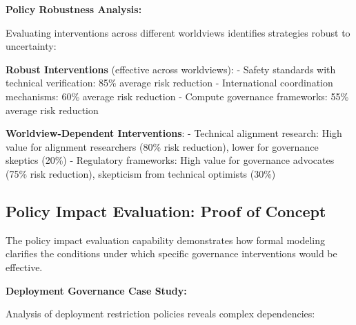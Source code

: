 \documentclass[
  11pt,
  letterpaper,
]{book}
\begin{document}
\textbf{Policy Robustness Analysis:}

Evaluating interventions across different worldviews identifies
strategies robust to uncertainty:

\textbf{Robust Interventions} (effective across worldviews): - Safety
standards with technical verification: 85\% average risk reduction -
International coordination mechanisms: 60\% average risk reduction -
Compute governance frameworks: 55\% average risk reduction

\textbf{Worldview-Dependent Interventions}: - Technical alignment
research: High value for alignment researchers (80\% risk reduction),
lower for governance skeptics (20\%) - Regulatory frameworks: High value
for governance advocates (75\% risk reduction), skepticism from
technical optimists (30\%)

\subsection{Policy Impact Evaluation: Proof of
Concept}\label{sec-policy-impact}

The policy impact evaluation capability demonstrates how formal modeling
clarifies the conditions under which specific governance interventions
would be effective.

\textbf{Deployment Governance Case Study:}

Analysis of deployment restriction policies reveals complex
dependencies:
\end{document}
